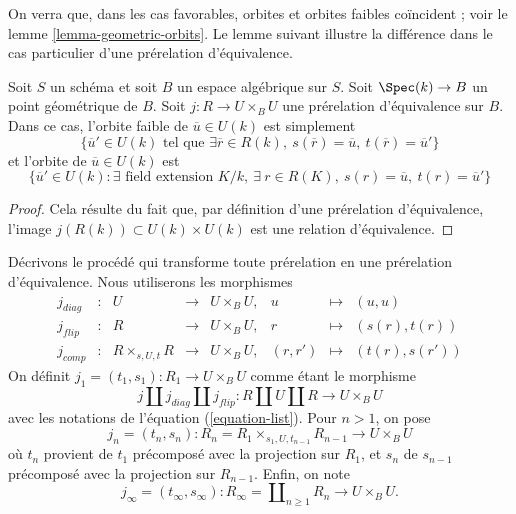\noindent
On verra que, dans les cas favorables, orbites et orbites faibles coïncident ; voir
le lemme \ref{lemma-geometric-orbits}. Le lemme suivant illustre
la différence dans le cas particulier d'une prérelation d'équivalence.

\begin{lemma}
\label{lemma-weak-orbit-pre-equivalence}
Soit $S$ un schéma et soit $B$ un espace algébrique sur $S$.
Soit $\Spec(k) \to B$ un point géométrique de $B$.
Soit $j : R \to U \times_B U$ une prérelation d'équivalence sur $B$.
Dans ce cas, l'orbite faible de $\overline{u} \in U(k)$ est simplement
$$
\{
\overline{u}' \in U(k)
\text{ tel que }
\exists \overline{r} \in R(k),
\ s(\overline{r}) = \overline{u},
\ t(\overline{r}) = \overline{u}'
\}
$$
et l'orbite de $\overline{u} \in U(k)$ est
$$
\{
\overline{u}' \in U(k) :
\exists\text{ field extension }K/k, \ \exists\ r \in R(K),
\ s(r) = \overline{u}, \ t(r) = \overline{u}'\}
$$
\end{lemma}

\begin{proof}
Cela résulte du fait que, par définition d'une prérelation d'équivalence, l'image
$j(R(k)) \subset U(k) \times U(k)$ est une relation d'équivalence.
\end{proof}

\noindent
Décrivons le procédé qui transforme toute prérelation en une
prérelation d'équivalence. Nous utiliserons les morphismes
\begin{equation}
\label{equation-list}
\begin{matrix}
j_{diag} &
: &
U &
\longrightarrow &
U \times_B U, &
u &
\longmapsto &
(u, u) \\
j_{flip} &
: &
R &
\longrightarrow &
U \times_B U, &
r &
\longmapsto &
(s(r), t(r)) \\
j_{comp} &
: &
R \times_{s, U, t} R &
\longrightarrow &
U \times_B U, &
(r, r') &
\longmapsto &
(t(r), s(r'))
\end{matrix}
\end{equation}
On définit $j_1 = (t_1, s_1) : R_1 \to U \times_B U$ comme étant le morphisme
$$
j \amalg j_{diag} \amalg j_{flip} :
R \amalg U \amalg R
\longrightarrow
U \times_B U
$$
avec les notations de
l'équation (\ref{equation-list}).
Pour $n > 1$, on pose
$$
j_n = (t_n, s_n) :
R_n = R_1 \times_{s_1, U, t_{n - 1}} R_{n - 1} \longrightarrow U \times_B U
$$
où $t_n$ provient de $t_1$ précomposé avec la projection sur $R_1$, et
$s_n$ de $s_{n - 1}$ précomposé avec la projection sur $R_{n - 1}$.
Enfin, on note
$$
j_\infty = (t_\infty, s_\infty) :
R_\infty = \coprod\nolimits_{n \geq 1} R_n
\longrightarrow
U \times_B U.
$$

